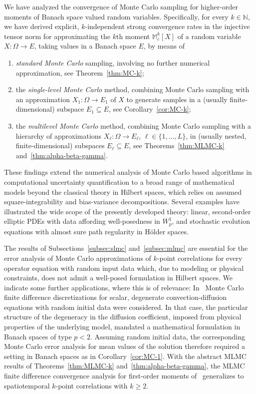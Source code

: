 \documentclass[reqno]{amsart}
\numberwithin{equation}{section}
\newcommand{\bbM}{\mathbb{M}}
\newcommand{\bbN}{\mathbb{N}}
\newcommand{\Mk}{\bbM^k_\varepsilon}
\newcommand{\from}{\colon}
\theoremstyle{remark}
\theoremstyle{definition}
\begin{document}
We have analyzed the convergence of Monte Carlo sampling   
for higher-order moments of 
Banach space valued random variables. 
Specifically, for every $k\in\bbN$, 
we have derived explicit, $k$-independent 
strong convergence rates  
in the injective tensor norm 
for approximating the $k$th moment $\Mk[X]$ 
of a random variable $X\from\Omega\to E$,
taking values in a Banach space $E$, 
by means of 
%
\begin{enumerate}[leftmargin=10mm, label=\Roman*.] 
	\item 
	\emph{standard Monte Carlo} sampling, 
	involving no further numerical approximation, 
	see Theorem~\ref{thm:MC-k}; 
	\item 
	the \emph{single-level Monte Carlo} method, 
	combining Monte Carlo sampling 
	with an approximation  
	$X_1\from\Omega\to E_1$ of $X$ 
	to generate 
	samples in a (usually finite-dimensional) 
	subspace $E_1\subseteq E$, 
	see Corollary~\ref{cor:MC-k}; 
	\item the \emph{multilevel Monte Carlo} method, 
	combining Monte Carlo sampling 
	with a hierarchy of approximations  
	$X_\ell\from\Omega\to E_\ell$, 
	$\ell\in\{1,\ldots,L\}$, 
	in (usually nested, finite-dimensional)
	subspaces $E_\ell \subseteq E$, 
	see Theorems~\ref{thm:MLMC-k} 
	and~\ref{thm:alpha-beta-gamma}. 	
\end{enumerate} 
% 
These findings  
extend the numerical analysis of 
Monte Carlo based algorithms in 
computational uncertainty quantification 
to a broad range of mathematical models 
beyond the classical theory in Hilbert spaces, 
which relies on assumed 
square-integrability 
and bias-variance decompositions. 
Several examples have illustrated 
the wide scope of 
the presently developed theory: 
linear, second-order elliptic PDEs with data 
affording well-posedness
in $W^{1}_{p}$, 
and
stochastic evolution equations 
with almost sure path regularity
in H\"older spaces. 

The results of 
Subsections~\ref{subsec:slmc} and~\ref{subsec:mlmc}
are essential for the error analysis of 
Monte Carlo approximations of $k$-point correlations for
every operator equation with random input data
which, 
due to modeling or physical constraints, 
does not admit a 
well-posed formulation 
in Hilbert spaces. 
%
We indicate some further applications, 
where this is of relevance:
In~\cite{KoleyRisebroSchwabWeber2017} 
Monte Carlo finite difference 
discretizations for 
scalar, degenerate convection-diffusion equations 
with random initial data were considered. 
In that case, the 
particular structure of the degeneracy in the diffusion coefficient,
imposed from physical properties of the underlying model, 
mandated a mathematical formulation 
in Banach spaces of type $p<2$.
%
Assuming random initial data, 
the corresponding Monte Carlo error analysis 
for mean values of 
the solution therefore 
required a setting in Banach spaces 
as in Corollary~\ref{cor:MC-1}. 
With the abstract MLMC results of 
Theorems~\ref{thm:MLMC-k} and~\ref{thm:alpha-beta-gamma}, 
the MLMC finite difference  
convergence analysis 
for first-order moments 
of~\cite{KoleyRisebroSchwabWeber2017} 
generalizes to spatiotemporal 
$k$-point correlations with $k\geq 2$. 
\end{document}
